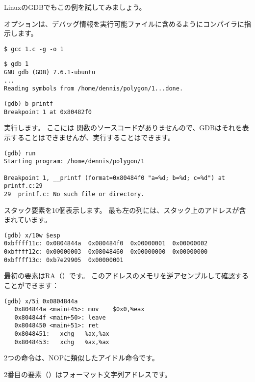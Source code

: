 Linuxの\ac{GDB}でもこの例を試してみましょう。

オプションは、デバッグ情報を実行可能ファイルに含めるようにコンパイラに指示します。

\begin{lstlisting}
$ gcc 1.c -g -o 1
\end{lstlisting}

\begin{lstlisting}
$ gdb 1
GNU gdb (GDB) 7.6.1-ubuntu
...
Reading symbols from /home/dennis/polygon/1...done.
\end{lstlisting}

\begin{lstlisting}[caption= \printf にブレークポイントを設定しましょう]
(gdb) b printf
Breakpoint 1 at 0x80482f0
\end{lstlisting}

実行します。
ここには \printf 関数のソースコードがありませんので、\ac{GDB}はそれを表示することはできませんが、実行することはできます。

\begin{lstlisting}
(gdb) run
Starting program: /home/dennis/polygon/1 

Breakpoint 1, __printf (format=0x80484f0 "a=%d; b=%d; c=%d") at printf.c:29
29	printf.c: No such file or directory.
\end{lstlisting}

スタック要素を10個表示します。 最も左の列には、スタック上のアドレスが含まれています。

\begin{lstlisting}
(gdb) x/10w $esp
0xbffff11c:	0x0804844a	0x080484f0	0x00000001	0x00000002
0xbffff12c:	0x00000003	0x08048460	0x00000000	0x00000000
0xbffff13c:	0xb7e29905	0x00000001
\end{lstlisting}

最初の要素は\ac{RA}（）です。 
このアドレスのメモリを逆アセンブルして確認することができます：

\begin{lstlisting}[label=NOP_as_XCHG_example,style=customasmx86]
(gdb) x/5i 0x0804844a
   0x804844a <main+45>:	mov    $0x0,%eax
   0x804844f <main+50>:	leave  
   0x8048450 <main+51>:	ret    
   0x8048451:	xchg   %ax,%ax
   0x8048453:	xchg   %ax,%ax
\end{lstlisting}

2つの命令は、\ac{NOP}に類似したアイドル命令です。

2番目の要素（）はフォーマット文字列アドレスです。

